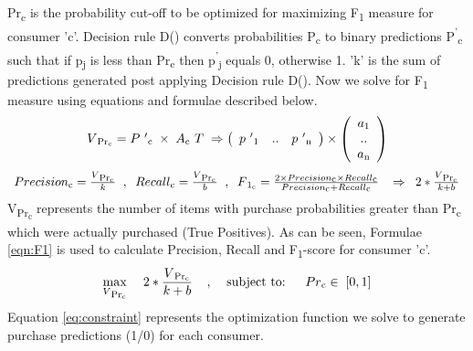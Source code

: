 Pr\textsubscript{c} is the probability cut-off to be optimized for maximizing F\textsubscript{1} measure \cite{lipton2014optimal} 
for consumer 'c'. Decision rule D() converts probabilities P\textsubscript{c} to binary predictions 
P\textsuperscript{'}\textsubscript{c} such that if p\textsubscript{j} is less than 
Pr\textsubscript{c} then p\textsuperscript{'}\textsubscript{j} equals 0, otherwise 1.
'k' is the sum of predictions generated post applying Decision rule D(). Now we solve for F\textsubscript{1} measure
using equations and formulae described below.
  \begin{equation}
    \begin{array}{l}
      V\textsubscript{Pr\textsubscript{c}} = 
      P\textsuperscript{'}\textsubscript{c}
      \;\times\; A\textsubscript{c}\textsuperscript{T}
      \;
      \Rightarrow	
      \left( \begin{array}{ccc}
      p\textsuperscript{'}\textsubscript{1} & .. & 
      p\textsuperscript{'}\textsubscript{n}
      \end{array} \right)
      \times
      \left( \begin{array}{ccc}
      a\textsubscript{1} \\
      .. \\
      a\textsubscript{n} \\
      \end{array} \right)
    \end{array}
    \label{eqn:probability}
  \end{equation}
  \begin{equation}
    \begin{array}{l}
      Precision\textsubscript{c}= \frac{V\textsubscript{Pr\textsubscript{c}}} {k}
      \;\;,\;\;
      Recall\textsubscript{c}= \frac{V\textsubscript{Pr\textsubscript{c}}} {b}
      \;\;,\;\;
      F\textsubscript{1\textsubscript{c}} = \frac{2 \times Precision\textsubscript{c} 
      \times Recall\textsubscript{c}} 
      {Precision\textsubscript{c} + Recall\textsubscript{c}}
      \;
      \;\; \Rightarrow	\;\;
      2 * 
      \frac{
        V\textsubscript{Pr\textsubscript{c}}
      }
      {
        k + b
      }
    \end{array}
    \label{eqn:F1}
  \end{equation}
V\textsubscript{Pr\textsubscript{c}} represents the number of items with purchase 
probabilities greater than Pr\textsubscript{c} which were actually purchased (True Positives). 
As can be seen, Formulae \ref{eqn:F1} is used to calculate Precision, Recall and 
F\textsubscript{1}-score for consumer 'c'. 
  \begin{equation}
    \max_{V\textsubscript{Pr\textsubscript{c}}} \;\;\;\; 2 * \frac{ V\textsubscript{Pr\textsubscript{c}}}{k + b}
    \;\;\;\;,\;\;\;\;  \text{subject to: } \;\;\;\;  Pr\textsubscript{c}  \in \; [0,1]
    \label{eq:constraint}
  \end{equation}
Equation \ref{eq:constraint} represents the optimization function we solve to generate purchase predictions (1/0) for each consumer.

